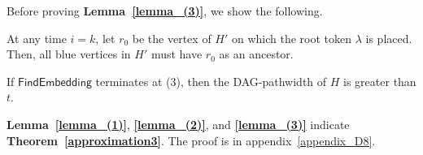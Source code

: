 \documentclass[runningheads]{llncs}
\theoremstyle{plain}
\theoremstyle{definition}
\begin{document}
\begin{comment}
\ifthenelse{\boolean{Draft}}{
\begin{figure*}[t]
    \centering
    \begin{minipage}[c]{0.48\textwidth}
        \centering
        \texttt{[image: pic13.eps]}
        \vspace{0.0cm}
        \caption{Illustration of the proof of \textbf{Lemma~\ref{blue_reachable}}. The recent common descendant of $r_0$ and $v$ is denoted as $r_0'$. The proof demonstrates that a contradiction arises if the blue vertex $v$ is not included in $G_{r_0}$, which consists of $r_0$ and its descendants.}
        \label{fig:13}
    \end{minipage}
    \hfill
    \begin{minipage}[c]{0.48\textwidth}
        \centering
        \texttt{[image: pic14.eps]}
        \vspace{0.0cm}
        \caption{Illustration of the proof of \textbf{Lemma~\ref{lemma_(3)}}. The blue vertices represent blue, the red check-marked vertices indicate token-removed vertices, and the other red vertices indicate vertices with tokens placed on them. The proof demonstrates that a contradiction arises if there are no vertices in $V_{h(M_{t, d, l})}$.}
        \label{fig:14}
    \end{minipage}
\end{figure*}
}
\end{comment}



Before proving \textbf{Lemma~\ref{lemma_(3)}}, we show the following.  


\begin{lemma}\label{blue_reachable}
    At any time $i = k$, let $r_0$ be the vertex of $H'$ on which the root token $\lambda$ is placed. Then, all blue vertices in $H'$ must have $r_0$ as an ancestor.
\end{lemma}


\begin{lemma}\label{lemma_(3)}
    If $\mathsf{FindEmbedding}$ terminates at (3), then the DAG-pathwidth of $H$ is greater than $t$.
\end{lemma}

\textbf{Lemma~\ref{lemma_(1)}}, \textbf{\ref{lemma_(2)}}, and \textbf{\ref{lemma_(3)}} indicate \textbf{Theorem~\ref{approximation3}}. The proof is in appendix~\ref{appendix_D8}.
\end{document}
